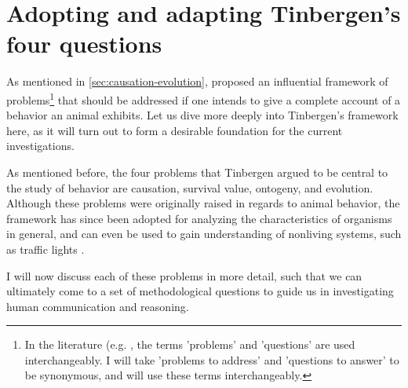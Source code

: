\section{Adopting and adapting Tinbergen's four questions}
\label{sec:tinbergen}
As mentioned in \cref{sec:causation-evolution}, \citet{Tinbergen63} proposed an influential framework of problems\footnote{In the literature (e.g. \citet{BatesonLaland13}, the terms 'problems' and 'questions' are used interchangeably. I will take 'problems to address' and 'questions to answer' to be synonymous, and will use these terms interchangeably.} that should be addressed if one intends to give a complete account of a behavior an animal exhibits. Let us dive more deeply into Tinbergen's framework here, as it will turn out to form a desirable foundation for the current investigations.

As mentioned before, the four problems that Tinbergen argued to be central to the study of behavior are causation, survival value, ontogeny, and evolution.
Although these problems were originally raised in regards to animal behavior, the framework has since been adopted for analyzing the characteristics of organisms in general, and can even be used to gain understanding of nonliving systems, such as traffic lights \citep{BatesonLaland13}.

I will now discuss each of these problems in more detail, such that we can ultimately come to a set of methodological questions to guide us in investigating human communication and reasoning.


